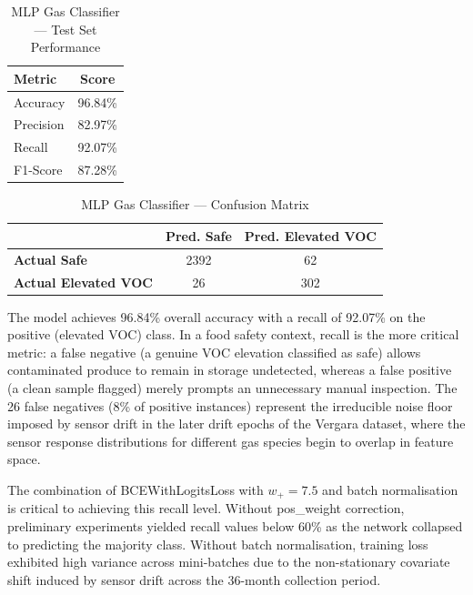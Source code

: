 \documentclass{ieeeaccess}
\begin{document}
\begin{table}[t]
\renewcommand{\arraystretch}{1.3}
\centering
\caption{MLP Gas Classifier --- Test Set Performance}
\label{tab:mlp_results}
\begin{tabular}{lc}
\toprule
\textbf{Metric} & \textbf{Score} \\
\midrule
Accuracy  & 96.84\% \\
Precision & 82.97\% \\
Recall    & 92.07\% \\
F1-Score  & 87.28\% \\
\bottomrule
\end{tabular}
\end{table}

\begin{table}[t]
\renewcommand{\arraystretch}{1.3}
\centering
\caption{MLP Gas Classifier --- Confusion Matrix}
\label{tab:mlp_cm}
\begin{tabular}{lcc}
\toprule
 & \textbf{Pred. Safe} & \textbf{Pred. Elevated VOC} \\
\midrule
\textbf{Actual Safe}         & 2392 & 62 \\
\textbf{Actual Elevated VOC} & 26   & 302 \\
\bottomrule
\end{tabular}
\end{table}

The model achieves 96.84\% overall accuracy with a recall of 92.07\% on the positive (elevated VOC) class. In a food safety context, recall is the more critical metric: a false negative (a genuine VOC elevation classified as safe) allows contaminated produce to remain in storage undetected, whereas a false positive (a clean sample flagged) merely prompts an unnecessary manual inspection. The 26 false negatives (8\% of positive instances) represent the irreducible noise floor imposed by sensor drift in the later drift epochs of the Vergara dataset, where the sensor response distributions for different gas species begin to overlap in feature space.

The combination of BCEWithLogitsLoss with $w_+ = 7.5$ and batch normalisation is critical to achieving this recall level. Without pos\_weight correction, preliminary experiments yielded recall values below 60\% as the network collapsed to predicting the majority class. Without batch normalisation, training loss exhibited high variance across mini-batches due to the non-stationary covariate shift induced by sensor drift across the 36-month collection period.
\end{document}
